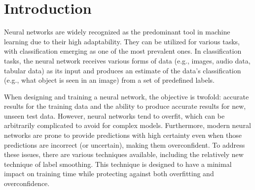 \section{Introduction}
Neural networks are widely recognized as the predominant tool in machine learning due to their high adaptability. They can be utilized for various tasks, with classification emerging as one of the most prevalent ones. In classification tasks, the neural network receives various forms of data (e.g., images, audio data, tabular data) as its input and produces an estimate of the data's classification (e.g., what object is seen in an image) from a set of predefined labels.

When designing and training a neural network, the objective is twofold: accurate results for the training data and the ability to produce accurate results for new, unseen test data. However, neural networks tend to overfit, which can be arbitrarily complicated to avoid for complex models. Furthermore, modern neural networks are prone to provide predictions with high certainty even when those predictions are incorrect (or uncertain), making them overconfident.
To address these issues, there are various techniques available, including the relatively new technique of label smoothing. This technique is designed to have a minimal impact on training time while protecting against both overfitting and overconfidence.

